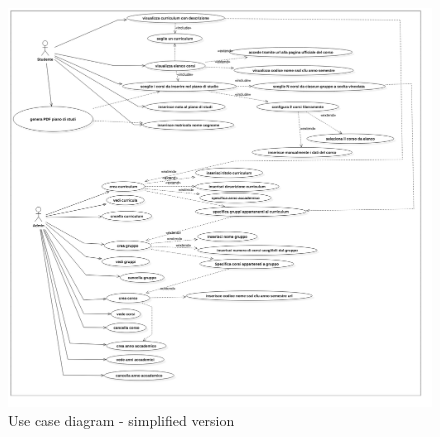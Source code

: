 \documentclass{article}
\begin{document}
\begin{figure}[H]
  \begin{center}
   \includegraphics[width=\textwidth]{img/UseCaseDiagram.png}
     \caption{Use case diagram - simplified version}
  \label{fig:Usecasediagram}
  \end{center}
\end{figure}



\newpage
\end{document}
